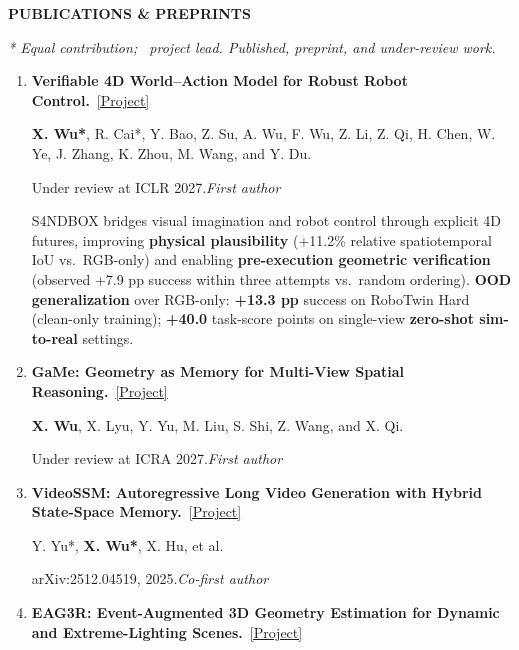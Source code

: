 \documentclass[a4paper]{article}
\newcommand{\cvsection}[1]{%
  \par\vspace{2.0pt}%
  {\color{cvblue}\fontsize{11}{12.2}\selectfont\bfseries\MakeUppercase{#1}}\par
  \vspace{-4pt}{\color{cvblue}\rule{\textwidth}{0.4pt}}\par\vspace{1.0pt}%
}
\newcommand{\pubgroup}[1]{%
  \par\vspace{2.0pt}{\color{cvblue}\fontsize{9.4}{10.4}\selectfont\bfseries #1}\par
}
\newcommand{\pubnote}[1]{\par{\color{cvgray}#1}}
\begin{document}
\cvsection{Publications \& Preprints}
{\fontsize{9}{9.65}\selectfont
\textit{* Equal contribution; \textdagger\ project lead. Published, preprint, and under-review work.}\par
\pubgroup{First- and Co-first-author Work}
\begin{enumerate}[leftmargin=1.6em,labelsep=0.38em,itemsep=0.4pt,topsep=1.3pt,parsep=0pt,partopsep=0pt]
\item \textbf{Verifiable 4D World--Action Model for Robust Robot Control.}~\href{https://candy-crusher.github.io/xiaoshanwu.github.io/projects/sandbox/}{\textcolor{cvblue}{[Project]}}\par
\textbf{X. Wu*}, R. Cai*, Y. Bao, Z. Su, A. Wu, F. Wu, Z. Li, Z. Qi, H. Chen, W. Ye, J. Zhang, K. Zhou, M. Wang, and Y. Du.\par
Under review at ICLR 2027.\hfill\textcolor{cvblue}{\textit{First author}}
\pubnote{S4NDBOX bridges visual imagination and robot control through explicit 4D futures, improving \textbf{physical plausibility} (+11.2\% relative spatiotemporal IoU vs.\ RGB-only) and enabling \textbf{pre-execution geometric verification} (observed +7.9 pp success within three attempts vs.\ random ordering).} \textbf{OOD generalization} over RGB-only: \textbf{+13.3 pp} success on RoboTwin Hard (clean-only training); \textbf{+40.0} task-score points on single-view \textbf{zero-shot sim-to-real} settings.
\item \textbf{GaMe: Geometry as Memory for Multi-View Spatial Reasoning.}~\href{https://candy-crusher.github.io/xiaoshanwu.github.io/projects/game/}{\textcolor{cvblue}{[Project]}}\par
\textbf{X. Wu}, X. Lyu, Y. Yu, M. Liu, S. Shi, Z. Wang, and X. Qi.\par
Under review at ICRA 2027.\hfill\textcolor{cvblue}{\textit{First author}}
\item \textbf{VideoSSM: Autoregressive Long Video Generation with Hybrid State-Space Memory.}~\href{https://candy-crusher.github.io/xiaoshanwu.github.io/projects/videossm/}{\textcolor{cvblue}{[Project]}}\par
Y. Yu*, \textbf{X. Wu*}, X. Hu, et al.\par
arXiv:2512.04519, 2025.\hfill\textcolor{cvblue}{\textit{Co-first author}}
\item \textbf{EAG3R: Event-Augmented 3D Geometry Estimation for Dynamic and Extreme-Lighting Scenes.}~\href{https://candy-crusher.github.io/xiaoshanwu.github.io/projects/eag3r/}{\textcolor{cvblue}{[Project]}}\par

\end{enumerate}}
\end{document}
